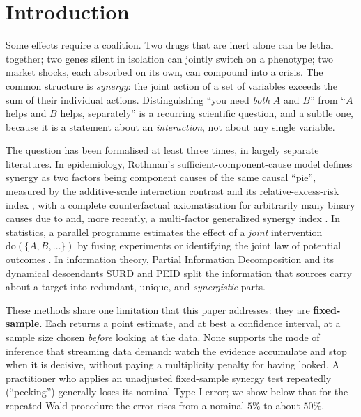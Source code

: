 \documentclass[pdflatex,sn-mathphys-ay]{sn-jnl}%
\theoremstyle{thmstyleone}%
\theoremstyle{thmstyletwo}%
\theoremstyle{thmstylethree}%
\begin{document}


\maketitle

\section{Introduction}\label{sec:intro}

Some effects require a coalition. Two drugs that are inert alone can be lethal
together; two genes silent in isolation can jointly switch on a phenotype; two
market shocks, each absorbed on its own, can compound into a crisis. The common
structure is \emph{synergy}: the joint action of a set of variables exceeds the sum
of their individual actions. Distinguishing ``you need
\emph{both} $A$ and $B$'' from ``$A$ helps and $B$ helps, separately''
is a recurring scientific question, and a subtle one, because it is a
statement about an \emph{interaction}, not about any single variable.

The question has been formalised at least three times, in largely separate
literatures. In epidemiology, Rothman's sufficient-component-cause model
\citep{rothman1976} defines synergy as two factors being component causes of the
same causal ``pie'', measured by the additive-scale interaction contrast and its
relative-excess-risk index \citep{hosmer1992,vanderweele2014}, with a complete
counterfactual axiomatisation for arbitrarily many binary causes due to
\citet{vanderweele2012} and, more recently, a multi-factor generalized synergy
index \citep{latorre2026}. In statistics, a parallel programme estimates the
effect of a \emph{joint} intervention $\mathrm{do}(\{A,B,\dots\})$ by fusing
experiments \citep{roquero2023} or identifying the joint law of potential
outcomes \citep{wu2025}. In information theory, Partial Information Decomposition
\citep{williams2010} and its dynamical descendants SURD
\citep{surd2024} and PEID \citep{peid2026} split the information that sources
carry about a target into redundant, unique, and \emph{synergistic} parts.

These methods share one limitation that this paper addresses: they are
\textbf{fixed-sample}. Each returns a point estimate, and at best a confidence
interval, at a sample size chosen \emph{before} looking at the data. None
supports the mode of inference that streaming data demand: watch the
evidence accumulate and stop when it is decisive, without paying a
multiplicity penalty for having looked. A practitioner who applies an unadjusted
fixed-sample synergy test repeatedly (``peeking'') generally loses its nominal
Type-I error; we show below that for the repeated Wald procedure the error
rises from a nominal $5\%$ to about $50\%$.
\end{document}
